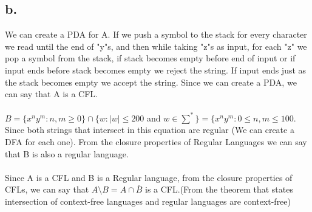 \documentclass[12pt]{article}
\begin{document}
\subsection*{b.}
We can create a PDA for A. If we push a symbol to the stack for every character we read until the end of "y"s, and then while taking "z"s as input, for each "z" we pop a symbol from the stack, if stack becomes empty before end of input or if input ends before stack becomes empty we reject the string. If input ends just as the stack becomes empty we accept the string. Since we can create a PDA, we can say that A is a CFL.\\
\\
$B=\lbrace x^ny^m : n,m\geq 0 \rbrace \cap \lbrace w : |w|\leq 200$ and $w\in \sum^* \rbrace = \lbrace x^ny^m: 0\leq n,m \leq 100$. Since both strings that intersect in this equation are regular (We can create a DFA for each one). From the closure properties of Regular Languages we can say that B is also a regular language.\\
\\
Since A is a CFL and B is a Regular language, from the closure properties of CFLs, we can say that $A\setminus B =  A\cap \overline{B}$ is a CFL.(From the theorem that states intersection of context-free languages and regular languages are context-free)
\end{document}
